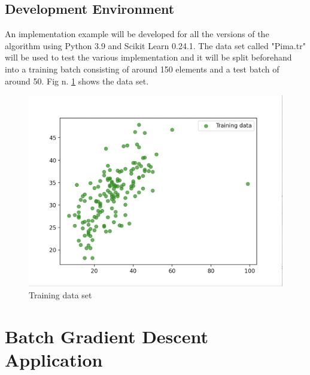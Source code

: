 \documentclass[conference]{IEEEtran}
\begin{document}
\subsection{Development Environment}
An implementation example will be developed for all the versions of the algorithm using Python 3.9 and Scikit Learn 0.24.1. The data set called "Pima.tr" will be used to test the various implementation and it will be split beforehand into a training batch consisting of around 150 elements and a test batch of around 50. Fig n. \ref{fig:data_set} shows the data set. 
\begin{center}
    \begin{figure}[ht]
    \includegraphics[scale=0.3]{Figures/Schermata 2021-05-11 alle 15.57.18.png}
    \caption{Training data set}
    \label{fig:data_set}
\end{figure}
\end{center}



\section{Batch Gradient Descent Application}
\end{document}
